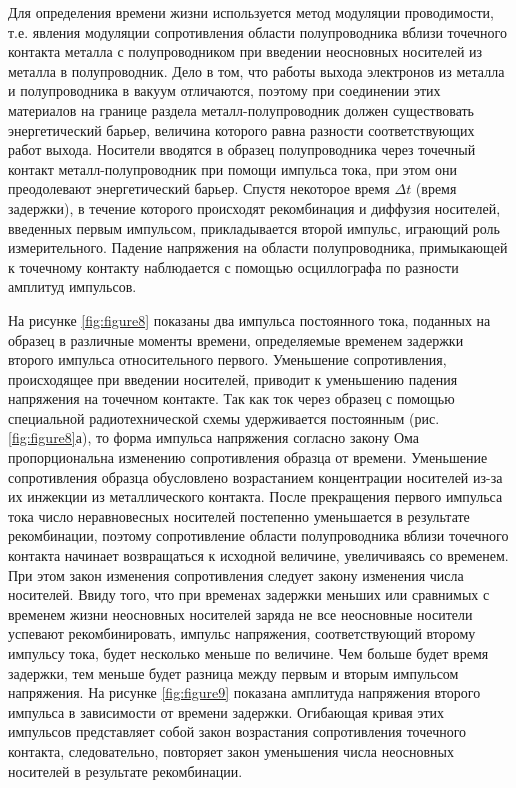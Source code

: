 Для определения времени жизни используется метод модуляции проводимости, т.е. явления модуляции сопротивления области полупроводника вблизи точечного контакта металла с полупроводником при введении неосновных носителей из металла в полупроводник. Дело в том, что работы выхода электронов из металла и полупроводника в вакуум отличаются, поэтому при соединении этих материалов на границе раздела металл-полупроводник должен существовать энергетический барьер, величина которого равна разности соответствующих работ выхода. Носители вводятся в образец полупроводника через точечный контакт металл-полупроводник при помощи импульса тока, при этом они преодолевают энергетический барьер. Спустя некоторое время $\Delta t$ (время задержки), в течение которого происходят рекомбинация и диффузия носителей, введенных первым импульсом, прикладывается второй импульс, играющий роль измерительного. Падение напряжения на области полупроводника, примыкающей к точечному контакту наблюдается с помощью осциллографа по разности амплитуд импульсов.


На рисунке \ref{fig:figure8} показаны два импульса постоянного тока, поданных на образец в различные моменты времени, определяемые временем задержки второго импульса относительного первого. Уменьшение сопротивления, происходящее при введении носителей, приводит к уменьшению падения напряжения на точечном контакте. Так как ток через образец с помощью специальной радиотехнической схемы удерживается постоянным (рис.  \ref{fig:figure8}а), то форма импульса напряжения согласно закону Ома пропорциональна изменению сопротивления образца от времени. Уменьшение сопротивления образца обусловлено возрастанием концентрации носителей из-за их инжекции из металлического контакта. После прекращения первого импульса тока число неравновесных носителей постепенно уменьшается в результате рекомбинации, поэтому сопротивление области полупроводника вблизи точечного контакта начинает возвращаться к исходной величине, увеличиваясь со временем. При этом закон изменения сопротивления следует закону изменения числа носителей. Ввиду того, что при временах задержки меньших или сравнимых с временем жизни неосновных носителей заряда не все неосновные носители успевают рекомбинировать, импульс напряжения, соответствующий второму импульсу тока, будет несколько меньше по величине. Чем больше будет время задержки, тем меньше будет разница между первым и вторым импульсом напряжения. На рисунке \ref{fig:figure9} показана амплитуда напряжения второго импульса в зависимости от времени задержки. Огибающая кривая этих импульсов представляет собой закон возрастания сопротивления точечного контакта, следовательно, повторяет закон уменьшения числа неосновных носителей в результате рекомбинации.

